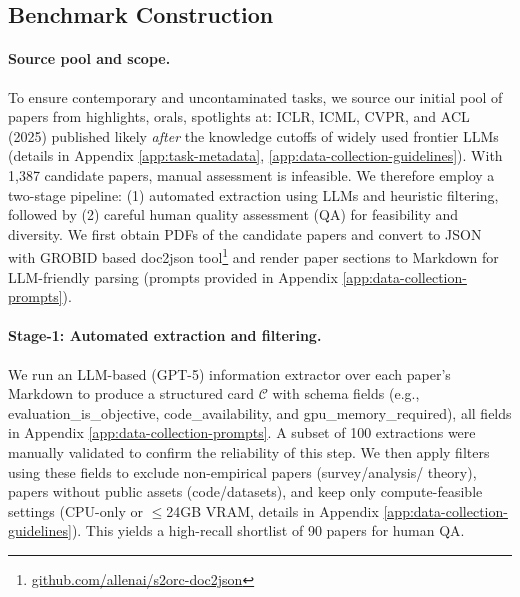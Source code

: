 \documentclass[11pt]{article}
\theoremstyle{plain}
\theoremstyle{definition}
\theoremstyle{remark}
\begin{document}
\subsection{Benchmark Construction} \label{rg:benchmark}

\paragraph{Source pool and scope.} To ensure contemporary and uncontaminated tasks, we source our initial pool of papers from highlights, orals, spotlights at: ICLR, ICML, CVPR, and ACL (2025) published likely \emph{after} the knowledge cutoffs of widely used frontier LLMs (details in Appendix \ref{app:task-metadata}, \ref{app:data-collection-guidelines}). 
With 1,387 candidate papers, manual assessment is infeasible. We therefore 
employ a two-stage pipeline: (1) automated extraction using LLMs and heuristic filtering, followed by (2) careful human quality assessment (QA) for feasibility and diversity.
We first obtain PDFs of the candidate papers and convert to JSON with GROBID based doc2json tool\footnote{\href{https://github.com/allenai/s2orc-doc2json}{github.com/allenai/s2orc-doc2json}} and render paper sections to Markdown for LLM-friendly parsing (prompts provided in Appendix \ref{app:data-collection-prompts}).

\paragraph{Stage-1: Automated extraction and filtering.}
We run an LLM-based (GPT-5) information extractor over each paper’s Markdown to produce a structured card $\mathcal{C}$ with schema fields (e.g., evaluation\_is\_objective, code\_availability, and gpu\_memory\_required), all fields in Appendix \ref{app:data-collection-prompts}.
A subset of 100 extractions were manually validated to confirm the reliability of this step. 
We then apply filters using these fields to exclude non-empirical papers (survey/analysis/%
theory), papers without public assets (code/datasets), and keep only compute-feasible settings (CPU-only or $\leq$24GB VRAM, details in Appendix \ref{app:data-collection-guidelines}).  
This yields a high-recall shortlist of 90 papers for human QA.
\end{document}
